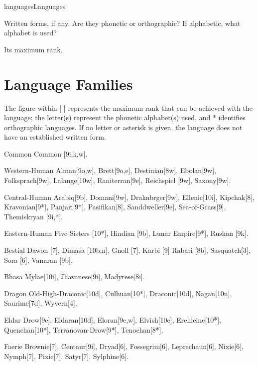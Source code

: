 \begin{Skill}[2.1]{languages}{Languages}
\begin{Itemize}
\item Written forms, if any.  Are they phonetic or orthographic? If
  alphabetic, what alphabet is used?

\item Its maximum rank. 

\end{Itemize}

\section{Language Families}
\label{languages:families}
The figure within [ ] represents the maximum rank that can be achieved
with the language; the letter(s) represent the phonetic alphabet(s)
used, and * identifies orthographic languages.  If no letter or
asterisk is given, the language does not have an established written
form.

\begin{Description}
  
\item[Common] Common [9i,k,w]. 

\item[Western-Human] Alman[9o,w], Brett[9o,e], Destinian[8w],
  Ebolan[9w], Folksprach[9w], Lalange[10w], Raniterran[9e], Reichspiel
  [9w], Saxony[9w].

\item[Central-Human] Arabiq[9b], Domani[9w], Draknbrger[9w],
  Ellenic[10i], Kipchak[8], Kravonian[9*], Panjari[9*], Pasifikan[8],
  Sanddweller[9e], Sea-of-Grass[9], Themiskryan [9i,*].

\item[Eastern-Human] Five-Sisters [10*], Hindian [9b], Lunar
  Empire[9*], Ruskan [9k].

\item[Bestial] Dawon [7], Dimasa [10b,n], Gnoll [7], Karbi [9] Rabari
  [8b], Sasquatch[3], Sora [6], Vanaran [9b].

\item[Bhasa] Mylae[10i], Jhavanese[9i], Madyrese[8i]. 

\item[Dragon] Old-High-Draconic[10d], Culhuan[10*], Draconic[10d],
  Nagan[10n], Saurime[7d], Wyvern[4].

\item[Eldar] Drow[9e], Eldaran[10d], Eloran[9e,w], Elvish[10e],
  Erehleine[10*], Quenchan[10*], Terranovan-Drow[9*], Tenochan[8*].

\item[Faerie] Brownie[7], Centaur[9i], Dryad[6], Fossegrim[6],
Leprechaun[6], Nixie[6], Nymph[7], Pixie[7], Satyr[7], Sylphine[6].


\end{Description}
\end{Skill}
